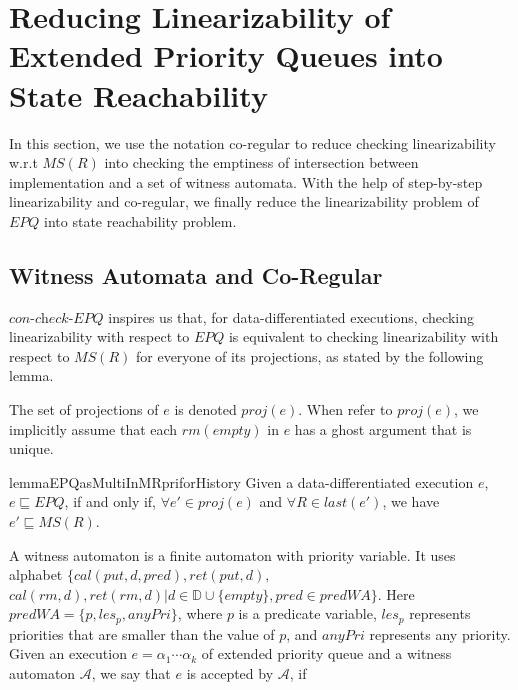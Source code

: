 \section{Reducing Linearizability of Extended Priority Queues into State Reachability}
\label{sec:co-regular of extended priority queues}

In this section, we use the notation co-regular to reduce checking linearizability w.r.t $\textit{MS}(R)$ into checking the emptiness of intersection between implementation and a set of witness automata. With the help of step-by-step linearizability and co-regular, we finally reduce the linearizability problem of $\textit{EPQ}$ into state reachability problem.



\subsection{Witness Automata and Co-Regular}
\label{subsec:definition of co-regular}

$\textit{con-check-EPQ}$ inspires us that, for data-differentiated executions, checking linearizability with respect to $\textit{EPQ}$ is equivalent to checking linearizability with respect to $\textit{MS}(R)$ for everyone of its projections, as stated by the following lemma.

The set of projections of $e$ is denoted $\textit{proj}(e)$. When refer to $\textit{proj}(e)$, we implicitly assume that each $\textit{rm}(\textit{empty})$ in $e$ has a ghost argument that is unique.

\begin{restatable}{lemma}{EPQasMultiInMRpriforHistory}
\label{lemma:EPQ as multi in MRpri for history}
Given a data-differentiated execution $e$, $e \sqsubseteq \textit{EPQ}$, if and only if, $\forall e' \in \textit{proj}(e)$ and $\forall R \in \textit{last}(e')$, we have $e' \sqsubseteq \textit{MS}(R)$.
\end{restatable}

A witness automaton is a finite automaton with priority variable. It uses alphabet $\{ \textit{cal}(\textit{put},d,\textit{pred}), \textit{ret}(\textit{put},d),$ $\textit{cal}(\textit{rm},d),\textit{ret}(\textit{rm},d) \vert d \in \mathbb{D} \cup \{ \textit{empty} \},\textit{pred} \in \textit{predWA} \}$. Here $\textit{predWA} = \{p, \textit{les}_p, \textit{anyPri}\}$, where $p$ is a predicate variable, $\textit{les}_p$ represents priorities that are smaller than the value of $p$, and $\textit{anyPri}$ represents any priority. Given an execution $e = \alpha_1 \cdots \alpha_k$ of extended priority queue and a witness automaton $\mathcal{A}$, we say that $e$ is accepted by $\mathcal{A}$, if


